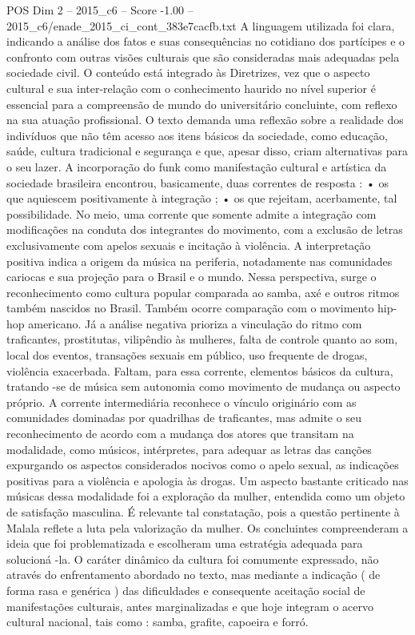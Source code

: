 \begin{textsample}{POS Dim 2 – 2015\_c6 – Score -1.00 – 2015\_c6/enade\_2015\_ci\_cont\_383e7cacfb.txt}
A linguagem utilizada foi clara, indicando a análise dos fatos e suas consequências no cotidiano dos partícipes e o confronto com outras visões culturais que são consideradas mais adequadas pela sociedade civil.
O conteúdo está integrado às Diretrizes, vez que o aspecto cultural e sua inter-relação com o conhecimento haurido no nível superior é essencial para a compreensão de mundo do universitário concluinte, com reflexo na sua atuação profissional.
O texto demanda uma reflexão sobre a realidade dos indivíduos que não têm acesso aos itens básicos da sociedade, como educação, saúde, cultura tradicional e segurança e que, apesar disso, criam alternativas para o seu lazer.
A incorporação do funk como manifestação cultural e artística da sociedade brasileira encontrou, basicamente, duas correntes de resposta : • os que aquiescem positivamente à integração ; • os que rejeitam, acerbamente, tal possibilidade.
No meio, uma corrente que somente admite a integração com modificações na conduta dos integrantes do movimento, com a exclusão de letras exclusivamente com apelos sexuais e incitação à violência.
A interpretação positiva indica a origem da música na periferia, notadamente nas comunidades cariocas e sua projeção para o Brasil e o mundo.
Nessa perspectiva, surge o reconhecimento como cultura popular comparada ao samba, axé e outros ritmos também nascidos no Brasil.
Também ocorre comparação com o movimento hip-hop americano.
Já a análise negativa prioriza a vinculação do ritmo com traficantes, prostitutas, vilipêndio às mulheres, falta de controle quanto ao som, local dos eventos, transações sexuais em público, uso frequente de drogas, violência exacerbada.
Faltam, para essa corrente, elementos básicos da cultura, tratando -se de música sem autonomia como movimento de mudança ou aspecto próprio.
A corrente intermediária reconhece o vínculo originário com as comunidades dominadas por quadrilhas de traficantes, mas admite o seu reconhecimento de acordo com a mudança dos atores que transitam na modalidade, como músicos, intérpretes, para adequar as letras das canções expurgando os aspectos considerados nocivos como o apelo sexual, as indicações positivas para a violência e apologia às drogas.
Um aspecto bastante criticado nas músicas dessa modalidade foi a exploração da mulher, entendida como um objeto de satisfação masculina.
É relevante tal constatação, pois a questão pertinente à Malala reflete a luta pela valorização da mulher.
Os concluintes compreenderam a ideia que foi problematizada e escolheram uma estratégia adequada para solucioná -la.
O caráter dinâmico da cultura foi comumente expressado, não através do enfrentamento abordado no texto, mas mediante a indicação ( de forma rasa e genérica ) das dificuldades e consequente aceitação social de manifestações culturais, antes marginalizadas e que hoje integram o acervo cultural nacional, tais como : samba, grafite, capoeira e forró.

\end{textsample}
